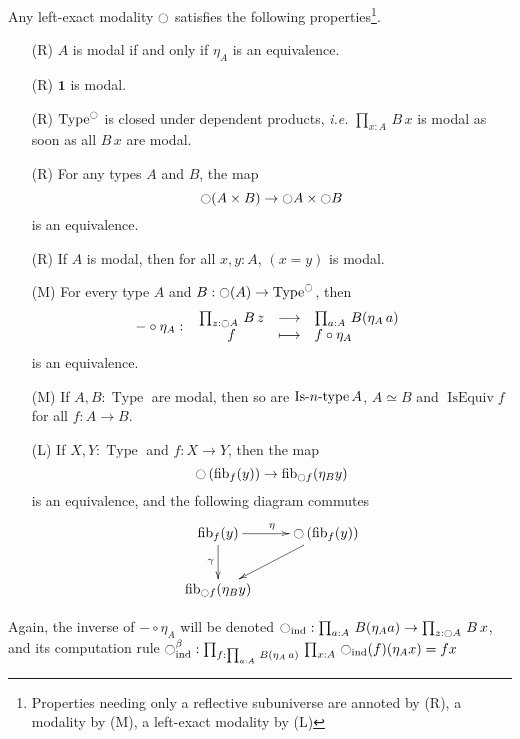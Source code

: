 \documentclass[notfinal]{jfrarticle}
\DeclareMathOperator{\Type}{Type}
\DeclareMathOperator{\IsEquiv}{IsEquiv}
\def\mymathhyphen{{\hbox{-}}}
\newcommand{\IsType}[1]
{\mathop{\mathrm{Is\mymathhyphen}#1\mathrm{\mymathhyphen type}} }
\newcommand{\modal}{\ensuremath{\ocircle}}
\newcommand \fib[2] {\mathrm{fib}_{#1}(#2)}
\newcommand \one {\mathbf{1}}
\newcommand{\prodD}[3]{\prod_{#1:#2}\, #3}
\newcommand{\fonction}[5]{ %
	#1 \, \colon \left.
	 \begin{array}{ccl}
		#2 & \longrightarrow & #3 \\
		#4 & \longmapsto & #5
	\end{array}
	\right.
}
\newcommand{\ie}{\emph{i.e.}}
\begin{document}
\begin{prop}\label{prop:mod_prop}
  Any left-exact modality $\modal$ satisfies the following
  properties\footnote{Properties needing only a reflective subuniverse
    are annoted by (R), a modality by (M), a left-exact modality by (L)}.
  \begin{itemize}
  \item[\labelitemi(R)] $A$ is modal if and only if $\eta_A$ is an equivalence.
  \item[\labelitemi(R)] $\one$ is modal.
  \item[\labelitemi(R)] $\Type^\modal$ is closed under dependent
    products, \ie{} $\prodD x A {B\, x}$ is modal as soon as all $B\,
    x$ are modal.
  \item[\labelitemi(R)] For any types $A$ and $B$, the map
    \[ \modal(A\times B) \to \modal A \times\modal B \]
    is an equivalence.
  \item[\labelitemi(R)] If $A$ is modal, then for all $x,y:A$, $(x=y)$
    is modal.
  \item[\labelitemi(M)] For every type $A$ and $B:\modal(A)\to\Type^\modal$, then
    \[ \fonction{-\circ\eta_A}{\prodD z {\modal A} {B\, z}}{\prodD a
        A {B(\eta_A\, a)}}{f}{f\circ \eta_A} \]
    is an equivalence.
  \item[\labelitemi(M)] If $A,B:\Type$ are modal, then so are $\IsType
    n A$, $A\simeq B$ and $\IsEquiv f$ for all $f:A\to B$.
  \item[\labelitemi(L)] If $X,Y:\Type$ and $f:X\to Y$, then the map
    \[ \modal \left( \fib f y\right) \to \fib{\modal f}{\eta_B
        y} \]
    is an equivalence, and the following diagram commutes
\[ \xymatrix{
  \fib f y \ar[r]^\eta \ar[d]_\gamma & \modal \left(\fib f y \right) \ar[dl]\\
  \fib{\modal f}{\eta_B y} & }\] 
  \end{itemize}
\end{prop}

\begin{rmq}
  Again, the inverse of $- \circ \eta_A$ will be denoted
  $\modal_{\mathrm{ind}} : \prodD a A {B (\eta_A a)} \to \prodD z
  {\modal A} {B\, x}$, and its computation rule
  $\modal_{\mathrm{ind}}^\beta : \prodD f {\prodD a
        A {B(\eta_A\, a)}} {\prodD x A
        {\modal_{\mathrm{ind}}(f)(\eta_A x) }} = f x$
\end{rmq}
\end{document}
